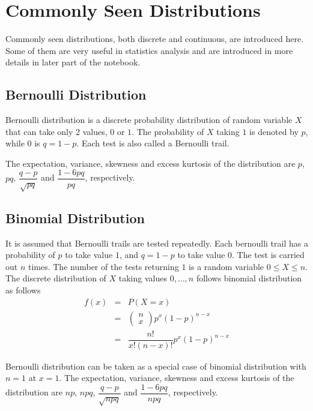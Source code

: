 \chapter{Commonly Seen Distributions} \label{ch:commondistribution}

Commonly seen distributions, both discrete and continuous, are introduced here. Some of them are very useful in statistics analysis and are introduced in more details in later part of the notebook.

\section{Bernoulli Distribution}

Bernoulli distribution is a discrete probability distribution of random variable $X$ that can take only 2 values, $0$ or $1$. The probability of $X$ taking $1$ is denoted by $p$, while $0$ is $q=1-p$. Each test is also called a Bernoulli trail.

The expectation, variance, skewness and excess kurtosis of the distribution are $p$, $pq$, $\dfrac{q-p}{\sqrt{pq}}$ and $\dfrac{1-6pq}{pq}$, respectively.

\section{Binomial Distribution}

It is assumed that Bernoulli trails are tested repeatedly. Each bernoulli trail has a probability of $p$ to take value $1$, and $q=1-p$ to take value $0$. The test is carried out $n$ times. The number of the tests returning $1$ is a random variable $0\leq X \leq n$. The discrete distribution of $X$ taking values $0, \ldots, n$ follows binomial distribution as follows
\begin{eqnarray}
  f(x) &=& P(X=x) \nonumber \\
  &=& \left(\begin{array}{c}
              n \\
              x
            \end{array}\right)p^x(1-p)^{n-x} \nonumber \\
  &=& \dfrac{n!}{x!(n-x)!}p^x(1-p)^{n-x}
\end{eqnarray}

Bernoulli distribution can be taken as a special case of binomial distribution with $n=1$ at $x=1$. The expectation, variance, skewness and excess kurtosis of the distribution are $np$, $npq$, $\dfrac{q-p}{\sqrt{npq}}$ and $\dfrac{1-6pq}{npq}$, respectively.

